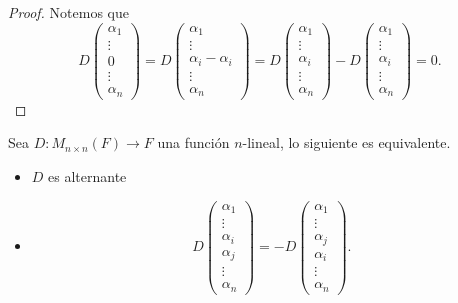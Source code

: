 \documentclass[12pt,a4paper]{book}
\begin{document}
    \begin{proof}
        Notemos que
        \[
        D
        \begin{pmatrix}
        \alpha_1\\
        \vdots\\
        0\\
        \vdots\\
        \alpha_n
    \end{pmatrix} = D
    \begin{pmatrix}
        \alpha_1\\
        \vdots\\
        \alpha_i - \alpha_i\\
        \vdots\\
        \alpha_n
    \end{pmatrix} = D
    \begin{pmatrix}
        \alpha_1\\
        \vdots\\
        \alpha_i\\
        \vdots\\
        \alpha_n
    \end{pmatrix} - D
    \begin{pmatrix}
        \alpha_1\\
        \vdots\\
        \alpha_i\\
        \vdots\\
        \alpha_n
    \end{pmatrix} = 0.
        \]
    \end{proof}

    \begin{lema}
        Sea $D:M_{n \times n}(F) \to F$ una función $n$-lineal, lo siguiente es equivalente.
        \begin{itemize}
            \item[(1)] $D$ es alternante
            \item[(2)]  
            \[
            D\begin{pmatrix}
                \alpha_1\\
                \vdots\\
                \alpha_i\\
                \alpha_j\\
                \vdots\\
                \alpha_n
            \end{pmatrix} = -D
            \begin{pmatrix}
                \alpha_1\\
                \vdots\\
                \alpha_j\\
                \alpha_i\\
                \vdots\\
                \alpha_n
            \end{pmatrix}.
            \]
        \end{itemize}
    \end{lema}
    
\end{document}

